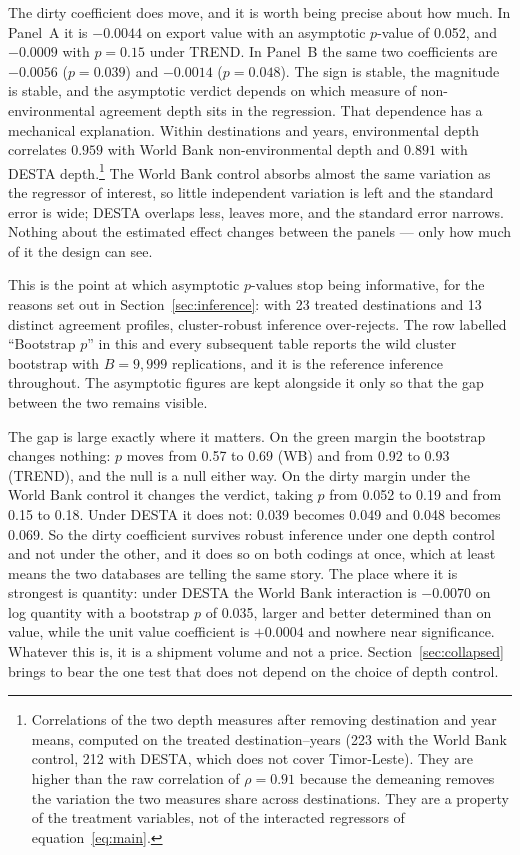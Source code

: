 \documentclass[12pt]{article}
\begin{document}
The dirty coefficient does move, and it is worth being precise about how much. In Panel~A it is
$-0.0044$ on export value with an asymptotic $p$-value of 0.052, and $-0.0009$ with $p = 0.15$ under
TREND. In Panel~B the same two coefficients are $-0.0056$ ($p = 0.039$) and $-0.0014$ ($p = 0.048$).
The sign is stable, the magnitude is stable, and the asymptotic verdict depends on which measure of
non-environmental agreement depth sits in the regression. That dependence has a mechanical
explanation. Within destinations and years, environmental depth correlates $0.959$ with World Bank
non-environmental depth and $0.891$ with DESTA depth.\footnote{Correlations of the two depth
measures after removing destination and year means, computed on the treated destination--years
(223 with the World Bank control, 212 with DESTA, which does not cover Timor-Leste). They are
higher than the raw correlation of $\rho = 0.91$ because the demeaning removes the variation the
two measures share across destinations. They are a property of the treatment variables, not of the
interacted regressors of equation~\eqref{eq:main}.} The World
Bank control absorbs almost the same variation as the regressor of interest, so little independent
variation is left and the standard error is wide; DESTA overlaps less, leaves more, and the standard
error narrows. Nothing about the estimated effect changes between the panels --- only how much of it
the design can see.

This is the point at which asymptotic $p$-values stop being informative, for the reasons set out in
Section~\ref{sec:inference}: with 23 treated destinations and 13 distinct agreement profiles,
cluster-robust inference over-rejects. The row labelled ``Bootstrap $p$'' in this and every subsequent
table reports the wild cluster bootstrap with $B = 9{,}999$ replications, and it is the reference
inference throughout. The asymptotic figures are kept alongside it only so that the gap between the
two remains visible.

The gap is large exactly where it matters. On the green margin the bootstrap changes nothing: $p$
moves from 0.57 to 0.69 (WB) and from 0.92 to 0.93 (TREND), and the null is a null either way. On the
dirty margin under the World Bank control it changes the verdict, taking $p$ from 0.052 to 0.19 and
from 0.15 to 0.18. Under DESTA it does not: 0.039 becomes 0.049 and 0.048 becomes 0.069. So the dirty
coefficient survives robust inference under one depth control and not under the other, and it does so
on both codings at once, which at least means the two databases are telling the same story. The place
where it is strongest is quantity: under DESTA the World Bank interaction is $-0.0070$ on log quantity
with a bootstrap $p$ of 0.035, larger and better determined than on value, while the unit value
coefficient is $+0.0004$ and nowhere near significance. Whatever this is, it is a shipment volume and
not a price. Section~\ref{sec:collapsed} brings to bear the one test that does not depend on the
choice of depth control.
\end{document}
